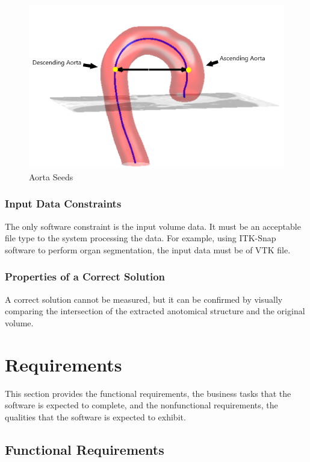 \documentclass[12pt]{article}
\begin{document}
\begin{figure}[H]
\centering
\includegraphics[width=120mm]{Aorta_seeds}
\caption{Aorta Seeds ~\cite{6346433}} \label{AortaSeeds} 
\end{figure} 

\subsubsection{Input Data Constraints} \label{sec_DataConstraints}    
The only software constraint is the input volume data. It must be an acceptable file type to the system processing the data. For example, using ITK-Snap software to perform organ segmentation, the input data must be of VTK file.

\subsubsection{Properties of a Correct Solution} \label{sec_CorrectSolution}

\noindent
A correct solution cannot be measured, but it can be confirmed by visually comparing the intersection of the extracted anotomical structure and the original volume.

\section{Requirements}

This section provides the functional requirements, the business tasks that the
software is expected to complete, and the nonfunctional requirements, the
qualities that the software is expected to exhibit.

\subsection{Functional Requirements}
\end{document}

